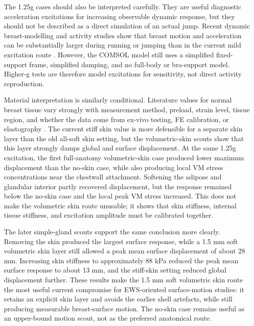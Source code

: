 The 1.25g cases should also be interpreted carefully. They are useful diagnostic acceleration excitations for increasing observable dynamic response, but they should not be described as a direct simulation of an actual jump. Recent dynamic breast-modelling and activity studies show that breast motion and acceleration can be substantially larger during running or jumping than in the current mild excitation route \cite{Chen2024,Chen2025}. However, the COMSOL model still uses a simplified fixed-support frame, simplified damping, and no full-body or bra-support model. Higher-g tests are therefore model excitations for sensitivity, not direct activity reproduction.

Material interpretation is similarly conditional. Literature values for normal breast tissue vary strongly with measurement method, preload, strain level, tissue region, and whether the data come from ex-vivo testing, FE calibration, or elastography \cite{Samani2007,Ramiao2016,Goodbrake2022,Teixeira2023,Patel2021}. The current stiff skin value is more defensible for a separate skin layer than the old all-soft skin setting, but the volumetric-skin scouts show that this layer strongly damps global and surface displacement. At the same 1.25g excitation, the first full-anatomy volumetric-skin case produced lower maximum displacement than the no-skin case, while also producing local VM stress concentrations near the chestwall attachment. Softening the adipose and glandular interior partly recovered displacement, but the response remained below the no-skin case and the local peak VM stress increased. This does not make the volumetric skin route unusable; it shows that skin stiffness, internal tissue stiffness, and excitation amplitude must be calibrated together.

The later simple-gland scouts support the same conclusion more clearly. Removing the skin produced the largest surface response, while a 1.5 mm soft volumetric skin layer still allowed a peak mean surface displacement of about 28 mm. Increasing skin stiffness to approximately 88 kPa reduced the peak mean surface response to about 13 mm, and the stiff-skin setting reduced global displacement further. These results make the 1.5 mm soft volumetric skin route the most useful current compromise for EWS-oriented surface-motion studies: it retains an explicit skin layer and avoids the earlier shell artefacts, while still producing measurable breast-surface motion. The no-skin case remains useful as an upper-bound motion scout, not as the preferred anatomical route.

